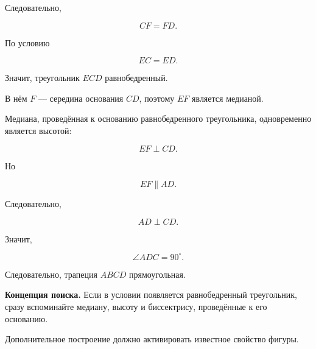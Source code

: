 \documentclass[a4paper,12pt]{article}
\begin{document}
Следовательно,

\[
CF=FD.
\]

По условию

\[
EC=ED.
\]

Значит, треугольник $ECD$ равнобедренный.

В нём $F$ --- середина основания $CD$,
поэтому $EF$ является медианой.

Медиана, проведённая к основанию равнобедренного треугольника,
одновременно является высотой:

\[
EF\perp CD.
\]

Но

\[
EF\parallel AD.
\]

Следовательно,

\[
AD\perp CD.
\]

Значит,

\[
\angle ADC=90^\circ.
\]

Следовательно,
трапеция $ABCD$ прямоугольная.

\begin{center}
\end{center}

\textbf{Концепция поиска.}
Если в условии появляется равнобедренный треугольник,
сразу вспоминайте медиану, высоту и биссектрису,
проведённые к его основанию.

Дополнительное построение должно активировать
известное свойство фигуры.
\end{document}
